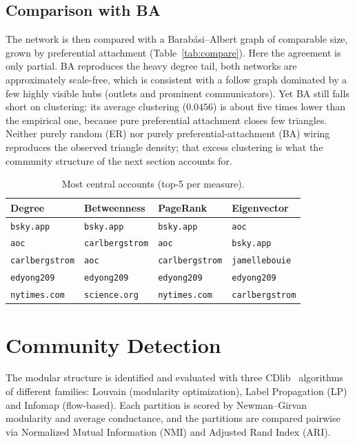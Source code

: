 \subsection{Comparison with BA}
The network is then compared with a Barab\'asi--Albert graph of comparable size, grown by preferential attachment (Table~\ref{tab:compare}). Here the agreement is only partial. BA reproduces the heavy degree tail, both networks are approximately scale-free, which is consistent with a follow graph dominated by a few highly visible hubs (outlets and prominent communicators). Yet BA still falls short on clustering: its average clustering ($0.0456$) is about five times lower than the empirical one, because pure preferential attachment closes few triangles. Neither purely random (ER) nor purely preferential-attachment (BA) wiring reproduces the observed triangle density; that excess clustering is what the community structure of the next section accounts for.

\begin{table}[h]
  \centering\footnotesize
  \setlength{\tabcolsep}{3pt}
  \caption{Most central accounts (top-5 per measure).}
  \label{tab:centrality}
  \begin{tabular}{llll}
    \toprule
    Degree & Betweenness & PageRank & Eigenvector \\
    \midrule
    \texttt{bsky.app}      & \texttt{bsky.app}      & \texttt{bsky.app}      & \texttt{aoc} \\
    \texttt{aoc}           & \texttt{carlbergstrom} & \texttt{aoc}           & \texttt{bsky.app} \\
    \texttt{carlbergstrom} & \texttt{aoc}           & \texttt{carlbergstrom} & \texttt{jamellebouie} \\
    \texttt{edyong209}     & \texttt{edyong209}     & \texttt{edyong209}     & \texttt{edyong209} \\
    \texttt{nytimes.com}   & \texttt{science.org}   & \texttt{nytimes.com}   & \texttt{carlbergstrom} \\
    \bottomrule
  \end{tabular}
\end{table}

\section{Community Detection}
\label{sec:cd}
The modular structure is identified and evaluated with three CDlib~\cite{cdlib} algorithms of different families: Louvain (modularity optimization), Label Propagation (LP) and Infomap (flow-based). Each partition is scored by Newman--Girvan modularity and average conductance, and the partitions are compared pairwise via Normalized Mutual Information (NMI) and Adjusted Rand Index (ARI).

